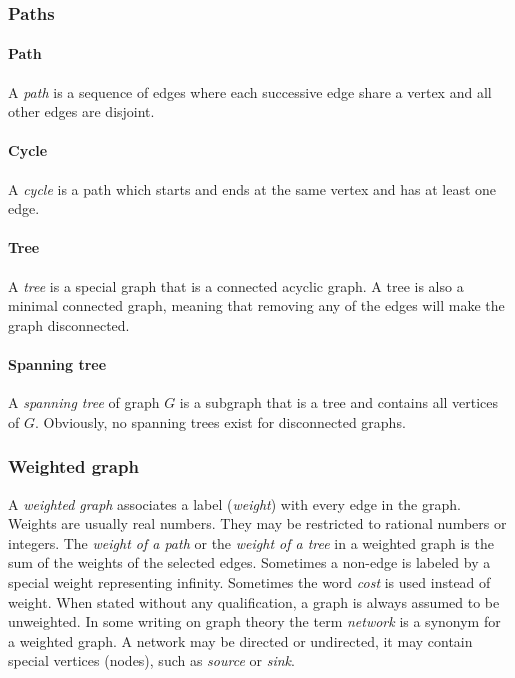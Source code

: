     \subsubsection{Paths}

      \paragraph{Path}

        A \emph{path} is a sequence of edges where each successive edge share a vertex and all other edges are disjoint.

      \paragraph{Cycle}

        A \emph{cycle} is a path which starts and ends at the same vertex and has at least one edge.

      \paragraph{Tree}

        A \emph{tree} is a special graph that is a connected acyclic graph. A tree is also a minimal connected graph, meaning that removing any of the edges will make the graph disconnected.


      \paragraph{Spanning tree}

        A \emph{spanning tree} of graph $G$ is a subgraph that is a tree and contains all vertices of $G$. Obviously, no spanning trees exist for disconnected graphs.
    
    \subsubsection{Weighted graph}
    
      A \emph{weighted graph} associates a label (\emph{weight}) with every edge in the graph. Weights are usually real numbers. They may be restricted to rational numbers or integers. The \emph{weight of a path} or the \emph{weight of a tree} in a weighted graph is the sum of the weights of the selected edges. Sometimes a non-edge is labeled by a special weight representing infinity. Sometimes the word \emph{cost} is used instead of weight. When stated without any qualification, a graph is always assumed to be unweighted. In some writing on graph theory the term \emph{network} is a synonym for a weighted graph. A network may be directed or undirected, it may contain special vertices (nodes), such as \emph{source} or \emph{sink}. 
    
